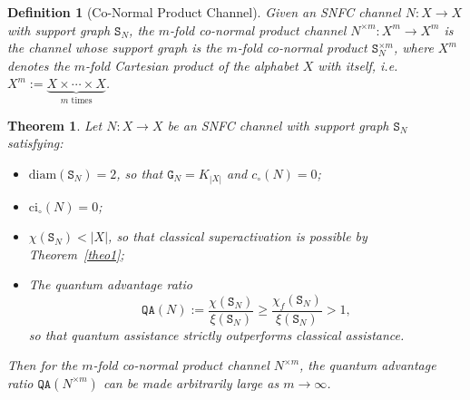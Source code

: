 \documentclass[12pt,a4paper]{article}
\newtheorem{theorem}{Theorem}
\newtheorem{definition}{Definition}
\begin{document}
\begin{definition}[Co-Normal Product 
Channel]\label{def:conormal-channel} Given an SNFC channel $N : X \to X$ with support graph $\mathtt{S}_N$, the \emph{$m$-fold co-normal product channel} $N^{\times m} : X^m \to X^m$ is the channel whose support graph is the $m$-fold co-normal product $\mathtt{S}_N^{\times m}$, where $X^m$ denotes the $m$-fold Cartesian product of the alphabet $X$ with itself, i.e. $X^m := \underbrace{X \times \cdots \times X}_{m \text{ times}}$.
\end{definition}

\begin{theorem}\label{theo8}
Let $N : X \to X$ be an SNFC channel with support graph $\mathtt{S}_N$ satisfying:
\begin{itemize}[itemsep=-0.15cm, parsep=0.15cm, topsep=2pt, leftmargin=1.0cm]
\item[\emph{a)}] $\mathrm{diam}(\mathtt{S}_N) = 2$, so that $\mathtt{G}_N = K_{|X|}$ and $c_\circ(N) = 0$;
\item[\emph{b)}] $\mathrm{ci}_\circ(N) = 0$;
\item[\emph{c)}] $\chi(\mathtt{S}_N) < |X|$, so that classical superactivation is possible by Theorem~\ref{theo1};
\item[\emph{d)}] The \emph{quantum advantage ratio}
\begin{equation*}
\mathtt{QA}(N) := \frac{\chi(\mathtt{S}_N)}{\xi(\mathtt{S}_N)}\ge\frac{\chi_f(\mathtt{S}_N)}{\xi(\mathtt{S}_N)} > 1,
\end{equation*}
so that quantum assistance strictly outperforms classical assistance.
\end{itemize}
Then for the $m$-fold co-normal product channel $N^{\times m}$, the quantum advantage ratio $\mathtt{QA}(N^{\times m})$ can be made arbitrarily large as $m \to \infty$.
\end{theorem}
\end{document}
